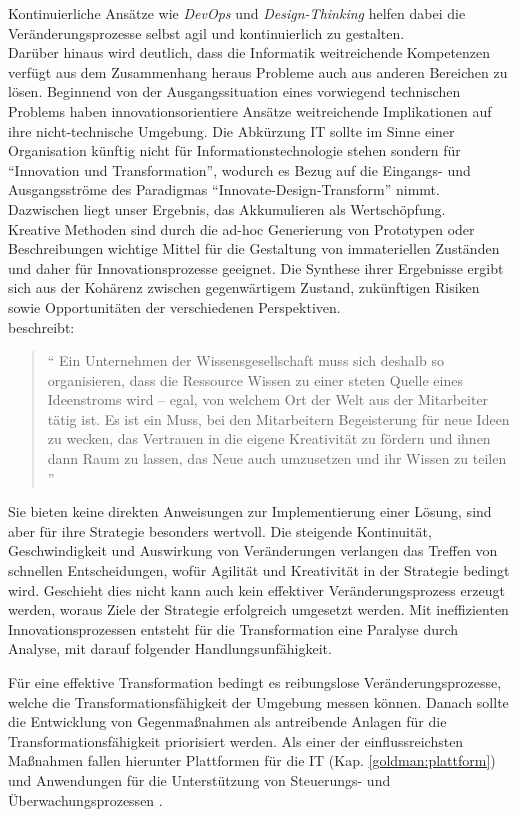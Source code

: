 Kontinuierliche Ansätze wie \emph{DevOps} und \emph{Design-Thinking} helfen dabei die Veränderungsprozesse selbst agil und kontinuierlich zu gestalten. 
\medskip
\\
Darüber hinaus wird deutlich, dass die Informatik weitreichende Kompetenzen verfügt aus dem Zusammenhang heraus Probleme auch aus anderen Bereichen zu lösen. Beginnend von der Ausgangssituation eines vorwiegend technischen Problems haben innovationsorientiere Ansätze weitreichende Implikationen auf ihre nicht-technische Umgebung. Die Abkürzung IT sollte im Sinne einer Organisation künftig nicht für Informationstechnologie stehen sondern für \enquote{Innovation und Transformation}, wodurch es Bezug auf die Eingangs- und Ausgangsströme des Paradigmas \enquote{Innovate-Design-Transform} nimmt. Dazwischen liegt unser Ergebnis, das Akkumulieren als Wertschöpfung.
\medskip
\\
Kreative Methoden sind durch die ad-hoc Generierung von Prototypen oder Beschreibungen wichtige Mittel für die Gestaltung von immateriellen Zuständen und daher für Innovationsprozesse geeignet. Die Synthese ihrer Ergebnisse ergibt sich aus der Kohärenz zwischen gegenwärtigem Zustand, zukünftigen Risiken sowie Opportunitäten der verschiedenen Perspektiven. 
\medskip
\\
\citet{Ganswindt2006} beschreibt:
\begin{quote}
    \enquote{
    Ein Unternehmen der Wissensgesellschaft muss sich deshalb so organisieren, dass die Ressource Wissen zu einer steten Quelle eines Ideenstroms wird – egal, von welchem Ort der Welt aus der Mitarbeiter tätig ist. Es ist ein Muss, bei den Mitarbeitern Begeisterung für neue Ideen zu wecken, das Vertrauen in die eigene Kreativität zu fördern und ihnen dann Raum zu lassen, das Neue auch umzusetzen und ihr Wissen zu teilen
    }
\end{quote}
\medskip
Sie bieten keine direkten Anweisungen zur Implementierung einer Lösung, sind aber für ihre Strategie besonders wertvoll. Die steigende Kontinuität, Geschwindigkeit und Auswirkung von Veränderungen verlangen das Treffen von schnellen Entscheidungen, wofür Agilität und Kreativität in der Strategie bedingt wird. Geschieht dies nicht kann auch kein effektiver Veränderungsprozess erzeugt werden, woraus Ziele der Strategie erfolgreich umgesetzt werden. Mit ineffizienten Innovationsprozessen entsteht für die Transformation eine Paralyse durch Analyse, mit darauf folgender Handlungsunfähigkeit. 

Für eine effektive Transformation bedingt es reibungslose Veränderungsprozesse, welche die Transformationsfähigkeit der Umgebung messen können. Danach sollte die Entwicklung von Gegenmaßnahmen als antreibende Anlagen für die Transformationsfähigkeit priorisiert werden. Als einer der einflussreichsten Maßnahmen fallen hierunter Plattformen für die IT (Kap. \ref{goldman:plattform}) und Anwendungen für die Unterstützung von Steuerungs- und Überwachungsprozessen \cite{Bussmann2006}.

